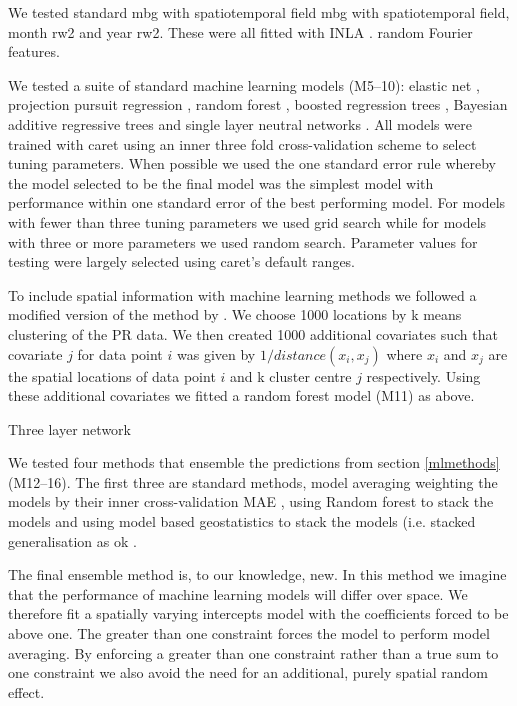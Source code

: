 \documentclass{bmcart}
\begin{document}


We tested
standard mbg with spatiotemporal field
mbg with spatiotemporal field, month rw2 and year rw2.
These were all fitted with INLA \cite{INLA}.
random Fourier features.


We tested a suite of standard machine learning models (M5--10): elastic net \cite{}, projection pursuit regression \cite{}, random forest \cite{ranger},  boosted regression trees \cite{xgboost}, Bayesian additive regressive trees \cite{} and single layer neutral networks \cite{nnet}.
All models were trained with caret \cite{caret} using an inner three fold cross-validation scheme to select tuning parameters.
When possible we used the one standard error rule \cite{Brodmann} whereby the model selected to be the final model was the simplest model with performance within one standard error of the best performing model.
For models with fewer than three tuning parameters we used grid search while for models with three or more parameters we used random search.
Parameter values for testing were largely selected using caret's default ranges.


To include spatial information with machine learning methods we followed a modified version of the method by \cite{}.
We choose 1000 locations by k means clustering of the PR data.
We then created 1000 additional covariates such that covariate $j$ for data point $i$ was given by $1 / distance (x_i, x_j)$ where $x_i$ and $x_j$ are the spatial locations of data point $i$ and k cluster centre $j$ respectively.
Using these additional covariates we fitted a random forest model (M11) as above.



Three layer network



We tested four methods that ensemble the predictions from section \ref{mlmethods} (M12--16).
The first three are standard methods, model averaging weighting the models by their inner cross-validation MAE \cite{}, using Random forest to stack the models \cite{} and using model based geostatistics to stack the models (i.e. stacked generalisation as ok \cite{bhatt2016improved}.

The final ensemble method is, to our knowledge, new.
In this method we imagine that the performance of machine learning models will differ over space.
We therefore fit a spatially varying intercepts model with the coefficients forced to be above one.
The greater than one constraint forces the model to perform model averaging.
By enforcing a greater than one constraint rather than a true sum to one constraint we also avoid the need for an additional, purely spatial random effect.
\end{document}
